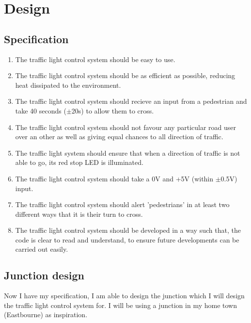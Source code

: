 \chapter{Design}

\section{Specification}
\begin{enumerate}
    \item The traffic light control system should be easy to use.
    \item The traffic light control system should be as efficient as possible, reducing heat dissipated to the environment.
    \item The traffic light control system should recieve an input from a pedestrian and take 40 seconds ($\pm$20s) to allow them to cross.
    \item The traffic light control system should not favour any particular road user over an other as well as giving equal chances to all direction of traffic.
    \item The traffic light system should ensure that when a direction of traffic is not able to go, its red stop LED is illuminated.
    \item The traffic light control system should take a 0V and +5V (within $\pm$0.5V) input.
    \item The traffic light control system should alert 'pedestrians' in at least two different ways that it is their turn to cross.
    \item The traffic light control system should be developed in a way such that, the code is clear to read and understand, to ensure future developments can be carried out easily.
\end{enumerate}

\section{Junction design}
Now I have my specification, I am able to design the junction which I will design the traffic light control system for. I will be using a junction in my home town (Eastbourne) as inspiration.
